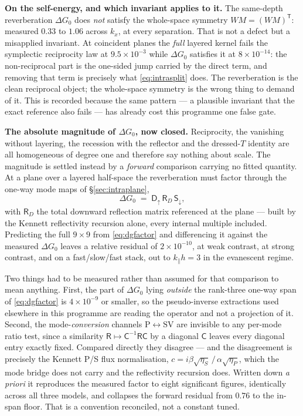 \documentclass[11pt,a4paper]{article}
\newcommand{\Gz}{G_0}
\begin{document}
\medskip\noindent
\textbf{On the self-energy, and which invariant applies to it.} The same-depth reverberation
$\Delta\Gz$ does \emph{not} satisfy the whole-space symmetry $W M = (W M)^{\mathsf T}$: measured
$0.33$ to $1.06$ across $k_x$, at every separation. That is not a defect but a
misapplied invariant. At coincident planes the \emph{full} layered kernel fails the symplectic
reciprocity law at $9.5\times10^{-3}$ while $\Delta\Gz$ satisfies it at $8\times10^{-14}$: the
non-reciprocal part is the one-sided jump carried by the direct term, and removing that term is
precisely what \eqref{eq:intrasplit} does. The reverberation is the clean reciprocal object; the
whole-space symmetry is the wrong thing to demand of it. This is recorded because the same
pattern --- a plausible invariant that the exact reference also fails --- has already cost this
programme one false gate.

\medskip\noindent
\textbf{The absolute magnitude of $\Delta\Gz$, now closed.} Reciprocity, the vanishing without
layering, the recession with the reflector and the dressed-$T$ identity are all homogeneous of
degree one and therefore say nothing about scale. The magnitude is settled instead by a
\emph{forward} comparison carrying no fitted quantity. At a plane over a layered half-space the
reverberation must factor through the one-way mode maps of \S\ref{sec:intraplane},
\begin{equation}
\Delta\Gz \;=\; \mathsf{D}_\uparrow\, \mathsf{R}_D\, \mathsf{S}_\downarrow ,
\label{eq:dgfactor}
\end{equation}
with $\mathsf{R}_D$ the total downward reflection matrix referenced at the plane --- built by
the Kennett reflectivity recursion alone, every internal multiple included. Predicting the full
$9\times9$ from \eqref{eq:dgfactor} and differencing it against the measured $\Delta\Gz$ leaves
a relative residual of $2\times10^{-10}$, at weak contrast, at strong contrast, and on a
fast/slow/fast stack, out to $k_\parallel h = 3$ in the evanescent regime.

Two things had to be measured rather than assumed for that comparison to mean anything. First,
the part of $\Delta\Gz$ lying \emph{outside} the rank-three one-way span of
\eqref{eq:dgfactor} is $4\times10^{-9}$ or smaller, so the pseudo-inverse extractions used
elsewhere in this programme are reading the operator and not a projection of it. Second, the
mode-\emph{conversion} channels $\mathrm{P}\!\leftrightarrow\!\mathrm{SV}$ are invisible to any
per-mode ratio test, since a similarity $\mathsf{R}\mapsto \mathsf{C}^{-1}\mathsf{R}\mathsf{C}$
by a diagonal $\mathsf{C}$ leaves every diagonal entry exactly fixed. Compared directly they
disagree --- and the disagreement is precisely the Kennett P/S flux normalisation,
$c = i\beta\sqrt{\eta_S}\,/\,\alpha\sqrt{\eta_P}$, which the mode bridge does not carry and the
reflectivity recursion does. Written down \emph{a priori} it reproduces the measured factor to
eight significant figures, identically across all three models, and collapses the forward
residual from $0.76$ to the in-span floor. That is a convention reconciled, not a constant
tuned.
\end{document}
